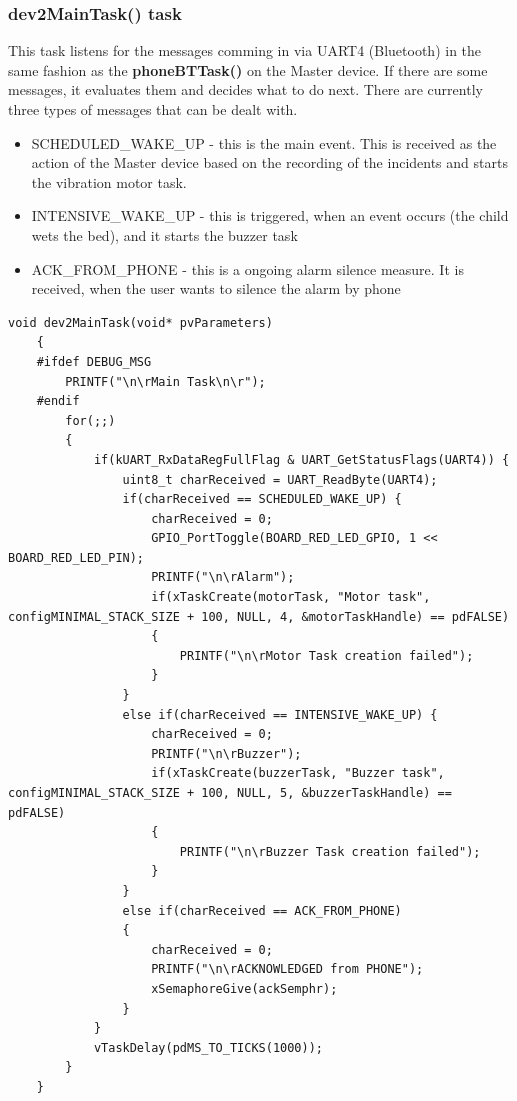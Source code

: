\documentclass[12pt,a4paper]{article}
\begin{document}
    \subsubsection*{dev2MainTask() task}
    This task listens for the messages comming in via UART4 (Bluetooth) in the same fashion as the {\bfseries phoneBTTask()} on the Master device. If there are some messages, it evaluates them and decides what to do next. There are currently three types of messages that can be dealt with.\\
    
    \begin{itemize}[topsep=4pt, itemsep=1pt]
     \item SCHEDULED\_WAKE\_UP - this is the main event. This is received as the action of the Master device based on the recording of the incidents and starts the vibration motor task.
     \item INTENSIVE\_WAKE\_UP - this is triggered, when an event occurs (the child wets the bed), and it starts the buzzer task
     \item ACK\_FROM\_PHONE - this is a ongoing alarm silence measure. It is received, when the user wants to silence the alarm by phone
    \end{itemize}
    
    \begin{lstlisting}[label={lst:dev2MainTask}, caption=dev2MainTask() task]
    void dev2MainTask(void* pvParameters)
    {
    #ifdef DEBUG_MSG
        PRINTF("\n\rMain Task\n\r");
    #endif
        for(;;)
        {
            if(kUART_RxDataRegFullFlag & UART_GetStatusFlags(UART4)) {
                uint8_t charReceived = UART_ReadByte(UART4);
                if(charReceived == SCHEDULED_WAKE_UP) {
                    charReceived = 0;
                    GPIO_PortToggle(BOARD_RED_LED_GPIO, 1 << BOARD_RED_LED_PIN);
                    PRINTF("\n\rAlarm");
                    if(xTaskCreate(motorTask, "Motor task", configMINIMAL_STACK_SIZE + 100, NULL, 4, &motorTaskHandle) == pdFALSE)
                    {
                        PRINTF("\n\rMotor Task creation failed");
                    }
                }
                else if(charReceived == INTENSIVE_WAKE_UP) {
                    charReceived = 0;
                    PRINTF("\n\rBuzzer");
                    if(xTaskCreate(buzzerTask, "Buzzer task", configMINIMAL_STACK_SIZE + 100, NULL, 5, &buzzerTaskHandle) == pdFALSE)
                    {
                        PRINTF("\n\rBuzzer Task creation failed");
                    }
                }
                else if(charReceived == ACK_FROM_PHONE)
                {
                    charReceived = 0;
                    PRINTF("\n\rACKNOWLEDGED from PHONE");
                    xSemaphoreGive(ackSemphr);
                }
            }
            vTaskDelay(pdMS_TO_TICKS(1000));
        }
    }
    \end{lstlisting}
    
\end{document}
